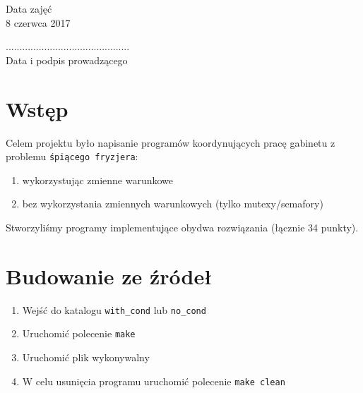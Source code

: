 \documentclass[12pt,a4paper]{article}
\newcommand{\datazajec}{8 czerwca 2017}
\begin{document}
	\begin{minipage}[t]{0.4\linewidth}
		\centering
		Data zajęć \\
		\small \datazajec
	\end{minipage}
	
	\begin{flushright}
		\begin{minipage}[t]{0.5\linewidth}
			\centering
			............................................. \\
			\small \textsf{Data i podpis prowadzącego}
		\end{minipage}
	\end{flushright}
	\pagebreak
	
	\section{Wstęp}
	Celem projektu było napisanie programów koordynujących pracę
	gabinetu z problemu \texttt{śpiącego fryzjera}:
	\begin{enumerate}[label=\alph*)]
		\item wykorzystując zmienne warunkowe
		\item bez wykorzystania zmiennych warunkowych (tylko 
			mutexy/semafory)
	\end{enumerate}
	
	Stworzyliśmy programy implementujące obydwa rozwiązania (łącznie
	34 punkty).
	
	\section{Budowanie ze źródeł}
	\begin{enumerate}
		\item Wejść do katalogu \texttt{with{\_}cond} lub 
			\texttt{no{\_}cond}
		\item Uruchomić polecenie \texttt{make}
		\item Uruchomić plik wykonywalny
		\item W celu usunięcia programu uruchomić polecenie
			\texttt{make clean}
	\end{enumerate}		
	
\end{document}
